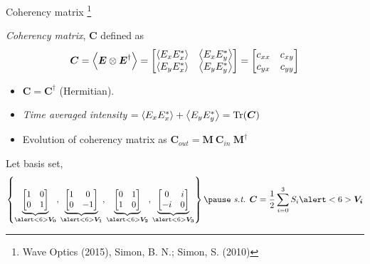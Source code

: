 \documentclass[12pt, dvipsnames]{beamer}
\numberwithin{equation}{section}
\newcommand\blfootnote[1]{%
	\begingroup
	\renewcommand\thefootnote{}\footnote{#1}%
	\addtocounter{footnote}{-1}%
	\endgroup
}
\begin{document}
\begin{frame}{Coherency matrix}\blfootnote{Wave Optics (2015), Simon, B. N.; Simon, S. (2010)}
	\textit{Coherency matrix}, $\boldsymbol{C}$ defined as 
	\begin{align*}
		\boldsymbol{C}=
		\expval{\boldsymbol{E}\otimes\boldsymbol{E}^\dagger}=
			\begin{bmatrix}
				\expval{E_xE_x^\ast} & \expval{E_xE_y^\ast}\\
				\expval{E_yE_x^\ast} & \expval{E_yE_y^\ast}
			\end{bmatrix}=
		\begin{bmatrix}
			c_{xx} & c_{xy}\\
			c_{yx} & c_{yy}
		\end{bmatrix}
	\end{align*}\pause
	\begin{itemize}
		\item
		$\boldsymbol{C}=\boldsymbol{C}^\dagger$ (\alert<2>{Hermitian}).\pause
		
		\item 
		\textit{Time averaged intensity} $=\expval{E_xE_x^\ast}+\expval{E_yE_y^\ast}=\Tr(\boldsymbol{C})$\pause
		
		\item \alert<4>{Evolution of coherency matrix as 
		$\boldsymbol{C}_{out} =  \boldsymbol{M}\:\boldsymbol{C}_{in}\:\boldsymbol{M}^\dagger$} 
	\end{itemize}\pause

	Let basis set, 
	$$\left\{
	\underbrace{\begin{bmatrix}1 & 0 \\ 0 & 1\\\end{bmatrix}}_{\alert<6>{\boldsymbol{V_0}}},
	\underbrace{\begin{bmatrix}1 & 0 \\ 0 & -1\\\end{bmatrix}}_{\alert<6>{\boldsymbol{V_1}}},
	\underbrace{\begin{bmatrix}0 & 1 \\ 1 & 0\\\end{bmatrix}}_{\alert<6>{\boldsymbol{V_2}}},
	\underbrace{\begin{bmatrix}0 & i \\ -i & 0\\\end{bmatrix}}_{\alert<6>{\boldsymbol{V_3}}}
	\right\}\pause \text{ \textit{s.t.} } \boldsymbol{C} = \frac{1}{2} \sum_{i=0}^{3} S_i \alert<6>{\boldsymbol{V_i}}$$
\end{frame}
\end{document}
